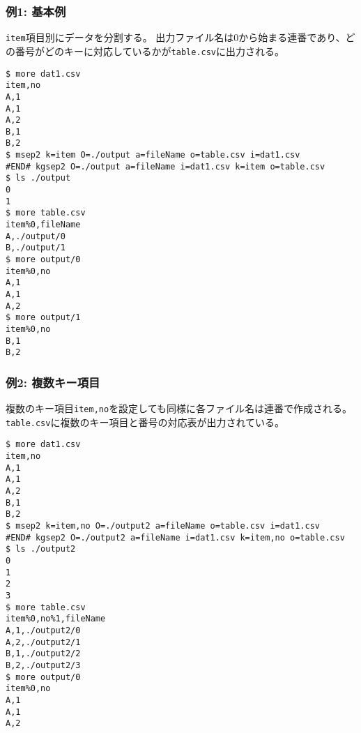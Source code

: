 \subsubsection*{例1: 基本例}

\verb|item|項目別にデータを分割する。
出力ファイル名は0から始まる連番であり、どの番号がどのキーに対応しているかが\verb|table.csv|に出力される。


\begin{Verbatim}[baselinestretch=0.7,frame=single]
$ more dat1.csv
item,no
A,1
A,1
A,2
B,1
B,2
$ msep2 k=item O=./output a=fileName o=table.csv i=dat1.csv
#END# kgsep2 O=./output a=fileName i=dat1.csv k=item o=table.csv
$ ls ./output
0
1
$ more table.csv
item%0,fileName
A,./output/0
B,./output/1
$ more output/0
item%0,no
A,1
A,1
A,2
$ more output/1
item%0,no
B,1
B,2
\end{Verbatim}
\subsubsection*{例2: 複数キー項目}

複数のキー項目\verb|item,no|を設定しても同様に各ファイル名は連番で作成される。
\verb|table.csv|に複数のキー項目と番号の対応表が出力されている。


\begin{Verbatim}[baselinestretch=0.7,frame=single]
$ more dat1.csv
item,no
A,1
A,1
A,2
B,1
B,2
$ msep2 k=item,no O=./output2 a=fileName o=table.csv i=dat1.csv
#END# kgsep2 O=./output2 a=fileName i=dat1.csv k=item,no o=table.csv
$ ls ./output2
0
1
2
3
$ more table.csv
item%0,no%1,fileName
A,1,./output2/0
A,2,./output2/1
B,1,./output2/2
B,2,./output2/3
$ more output/0
item%0,no
A,1
A,1
A,2
\end{Verbatim}
